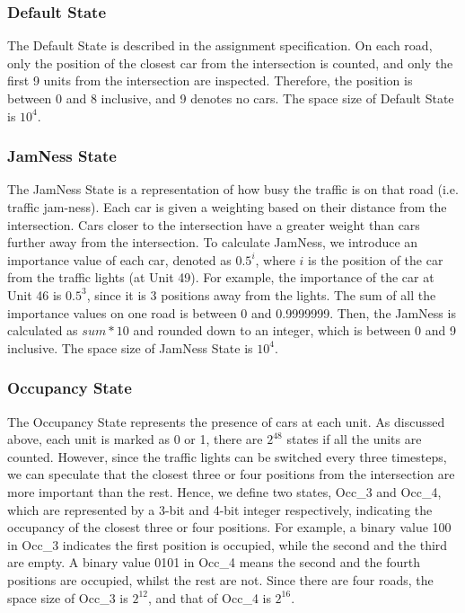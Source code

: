\subsubsection{Default State}
The Default State is described in the assignment specification. On each road, only the position of the closest car from the intersection is counted, and only the first 9 units from the intersection are inspected. Therefore, the position is between 0 and 8 inclusive, and 9 denotes no cars. The space size of Default State is $10^4$.

\subsubsection{JamNess State}
The JamNess State is a representation of how busy the traffic is on that road (i.e. traffic jam-ness). Each car is given a weighting based on their distance from the intersection. Cars closer to the intersection have a greater weight than cars further away from the intersection. To calculate JamNess, we introduce an importance value of each car, denoted as $0.5^i$, where $i$ is the position of the car from the traffic lights (at Unit 49). For example, the importance of the car at Unit 46 is $0.5^3$, since it is 3 positions away from the lights. The sum of all the importance values on one road is between 0 and 0.9999999. Then, the JamNess is calculated as $sum * 10$ and rounded down to an integer, which is between 0 and 9 inclusive. The space size of JamNess State is $10^4$.

\subsubsection{Occupancy State}
The Occupancy State represents the presence of cars at each unit. As discussed above, each unit is marked as 0 or 1, there are $2^{48}$ states if all the units are counted. However, since the traffic lights can be switched every three timesteps, we can speculate that the closest three or four positions from the intersection are more important than the rest. Hence, we define two states, Occ\_3 and Occ\_4, which are represented by a 3-bit and 4-bit integer respectively, indicating the occupancy of the closest three or four positions. For example, a binary value 100 in Occ\_3 indicates the first position is occupied, while the second and the third are empty. A binary value 0101 in Occ\_4 means the second and the fourth positions are occupied, whilst the rest are not. Since there are four roads, the space size of Occ\_3 is $2^{12}$, and that of Occ\_4 is $2^{16}$.

